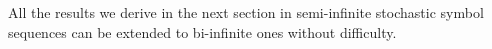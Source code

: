 All the results we derive in the next section in semi-infinite stochastic symbol sequences can be extended to bi-infinite ones without difficulty.







